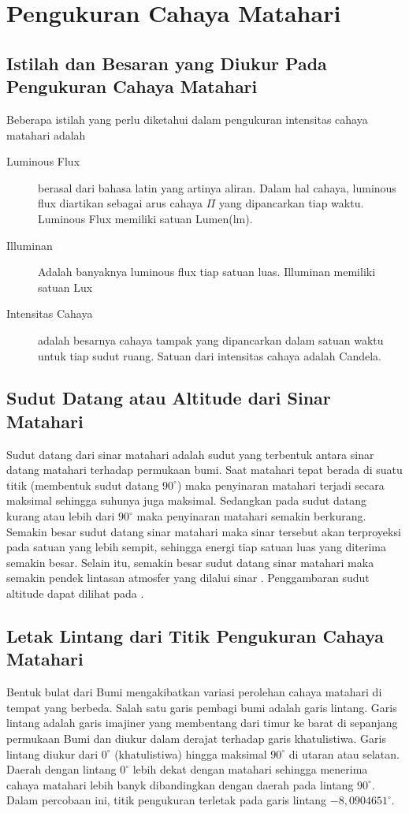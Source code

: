 \section{Pengukuran Cahaya Matahari}
\subsection{Istilah dan Besaran yang Diukur Pada Pengukuran Cahaya Matahari}
Beberapa istilah yang perlu diketahui dalam pengukuran intensitas cahaya matahari adalah
\begin{description}
    \item[Luminous Flux] berasal dari bahasa latin  yang artinya aliran. Dalam hal cahaya, luminous flux diartikan sebagai arus cahaya $\Pi$ yang dipancarkan tiap waktu. Luminous Flux memiliki satuan Lumen(lm).
    \item[Illuminan] Adalah banyaknya luminous flux tiap satuan luas. Illuminan memiliki satuan Lux
    \item[Intensitas Cahaya] adalah besarnya cahaya tampak yang dipancarkan dalam satuan waktu untuk tiap sudut ruang. Satuan dari intensitas cahaya adalah Candela.
\end{description}

\subsection{Sudut Datang atau Altitude dari Sinar Matahari}
Sudut datang dari sinar matahari adalah sudut yang terbentuk antara sinar datang matahari terhadap permukaan bumi. Saat matahari tepat berada di suatu titik (membentuk sudut datang $90^\circ$) maka penyinaran matahari terjadi secara maksimal sehingga suhunya juga maksimal. Sedangkan pada sudut datang kurang atau lebih dari $90^\circ$ maka penyinaran matahari semakin berkurang. Semakin besar sudut datang sinar matahari maka sinar tersebut akan terproyeksi pada satuan yang lebih sempit, sehingga energi tiap satuan luas yang diterima semakin besar. Selain itu, semakin besar sudut datang sinar matahari maka semakin pendek lintasan atmosfer yang dilalui sinar \cite{herreria2020solar}. Penggambaran sudut altitude dapat dilihat pada .
\subsection{Letak Lintang dari Titik Pengukuran Cahaya Matahari}
Bentuk bulat dari Bumi mengakibatkan variasi perolehan cahaya matahari di tempat yang berbeda. Salah satu garis pembagi bumi adalah garis lintang. Garis lintang adalah garis imajiner yang membentang dari timur ke barat di sepanjang permukaan Bumi dan diukur dalam derajat terhadap garis khatulistiwa. Garis lintang diukur dari $0^\circ$ (khatulistiwa) hingga maksimal $90^\circ$ di utaran atau selatan. Daerah dengan lintang $0^\circ$ lebih dekat dengan matahari sehingga menerima cahaya matahari lebih banyk dibandingkan dengan daerah pada lintang $90^\circ$. Dalam percobaan ini, titik pengukuran terletak pada garis lintang $-8,0904651^\circ$.

